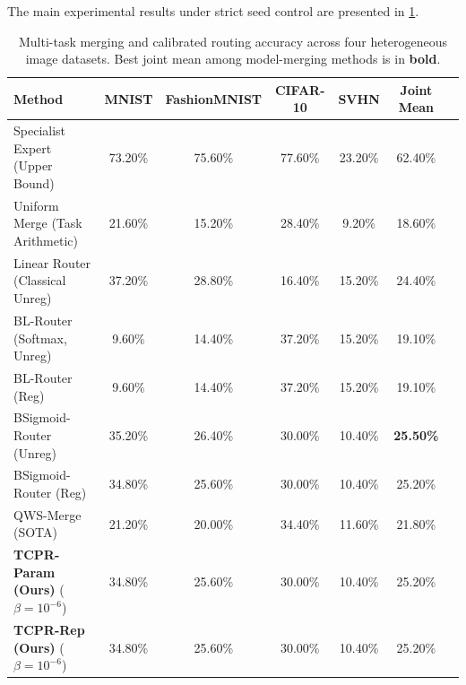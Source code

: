 The main experimental results under strict seed control are presented in \cref{tab:main_results}.

\begin{table}[t]
\caption{Multi-task merging and calibrated routing accuracy across four heterogeneous image datasets. Best joint mean among model-merging methods is in \textbf{bold}.}
\label{tab:main_results}
\vskip 0.15in
\begin{center}
\begin{small}
\begin{sc}
\begin{tabular}{lcccccr}
\toprule
Method & MNIST & FashionMNIST & CIFAR-10 & SVHN & Joint Mean \\
\midrule
Specialist Expert (Upper Bound) & 73.20\% & 75.60\% & 77.60\% & 23.20\% & 62.40\% \\
\midrule
Uniform Merge (Task Arithmetic) & 21.60\% & 15.20\% & 28.40\% & 9.20\% & 18.60\% \\
Linear Router (Classical Unreg)  & 37.20\% & 28.80\% & 16.40\% & 15.20\% & 24.40\% \\
BL-Router (Softmax, Unreg)       & 9.60\% & 14.40\% & 37.20\% & 15.20\% & 19.10\% \\
BL-Router (Reg)                  & 9.60\% & 14.40\% & 37.20\% & 15.20\% & 19.10\% \\
BSigmoid-Router (Unreg)          & 35.20\% & 26.40\% & 30.00\% & 10.40\% & \textbf{25.50\%} \\
BSigmoid-Router (Reg)            & 34.80\% & 25.60\% & 30.00\% & 10.40\% & 25.20\% \\
QWS-Merge (SOTA)                 & 21.20\% & 20.00\% & 34.40\% & 11.60\% & 21.80\% \\
\midrule
\textbf{TCPR-Param (Ours)} ($\beta = 10^{-6}$) & 34.80\% & 25.60\% & 30.00\% & 10.40\% & 25.20\% \\
\textbf{TCPR-Rep (Ours)} ($\beta = 10^{-6}$)  & 34.80\% & 25.60\% & 30.00\% & 10.40\% & 25.20\% \\
\bottomrule
\end{tabular}
\end{sc}
\end{small}
\end{center}
\vskip -0.1in
\end{table}

